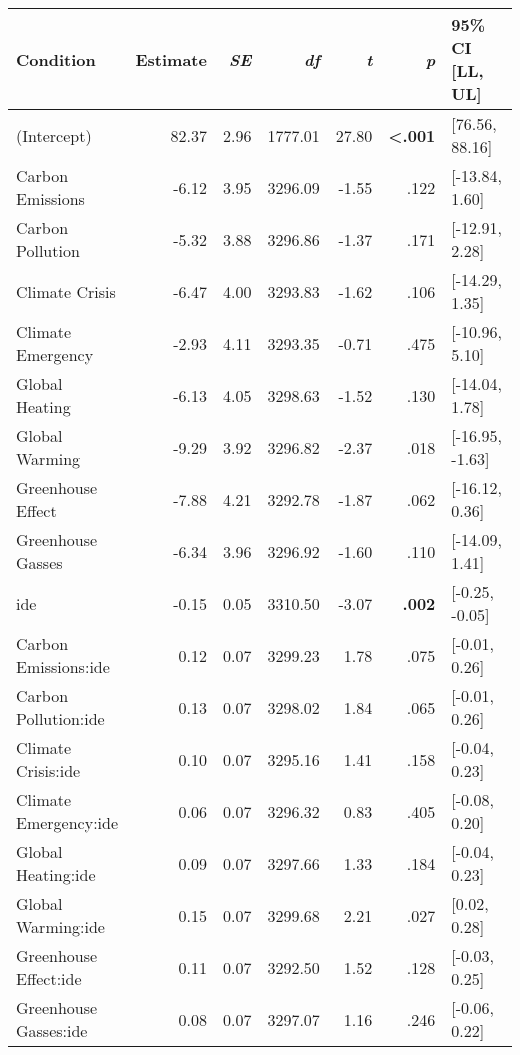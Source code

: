 \begin{table}[ht]
\centering
\begin{tabular}{lrrrrrl}
  \hline
Condition & Estimate & \textit{SE} & \textit{df} & \textit{t} & \textit{p} & 95\% CI [LL, UL] \\ 
  \hline
(Intercept) & 82.37 & 2.96 & 1777.01 & 27.80 & \textbf{\textless  .001} & [76.56, 88.16] \\ 
  Carbon Emissions & -6.12 & 3.95 & 3296.09 & -1.55 & .122 & [-13.84, 1.60] \\ 
  Carbon Pollution & -5.32 & 3.88 & 3296.86 & -1.37 & .171 & [-12.91, 2.28] \\ 
  Climate Crisis & -6.47 & 4.00 & 3293.83 & -1.62 & .106 & [-14.29, 1.35] \\ 
  Climate Emergency & -2.93 & 4.11 & 3293.35 & -0.71 & .475 & [-10.96, 5.10] \\ 
  Global Heating & -6.13 & 4.05 & 3298.63 & -1.52 & .130 & [-14.04, 1.78] \\ 
  Global Warming & -9.29 & 3.92 & 3296.82 & -2.37 & .018 & [-16.95, -1.63] \\ 
  Greenhouse Effect & -7.88 & 4.21 & 3292.78 & -1.87 & .062 & [-16.12, 0.36] \\ 
  Greenhouse Gasses & -6.34 & 3.96 & 3296.92 & -1.60 & .110 & [-14.09, 1.41] \\ 
  ide & -0.15 & 0.05 & 3310.50 & -3.07 & \textbf{.002} & [-0.25, -0.05] \\ 
  Carbon Emissions:ide & 0.12 & 0.07 & 3299.23 & 1.78 & .075 & [-0.01, 0.26] \\ 
  Carbon Pollution:ide & 0.13 & 0.07 & 3298.02 & 1.84 & .065 & [-0.01, 0.26] \\ 
  Climate Crisis:ide & 0.10 & 0.07 & 3295.16 & 1.41 & .158 & [-0.04, 0.23] \\ 
  Climate Emergency:ide & 0.06 & 0.07 & 3296.32 & 0.83 & .405 & [-0.08, 0.20] \\ 
  Global Heating:ide & 0.09 & 0.07 & 3297.66 & 1.33 & .184 & [-0.04, 0.23] \\ 
  Global Warming:ide & 0.15 & 0.07 & 3299.68 & 2.21 & .027 & [0.02, 0.28] \\ 
  Greenhouse Effect:ide & 0.11 & 0.07 & 3292.50 & 1.52 & .128 & [-0.03, 0.25] \\ 
  Greenhouse Gasses:ide & 0.08 & 0.07 & 3297.07 & 1.16 & .246 & [-0.06, 0.22] \\ 
   \hline
\end{tabular}
\end{table}
